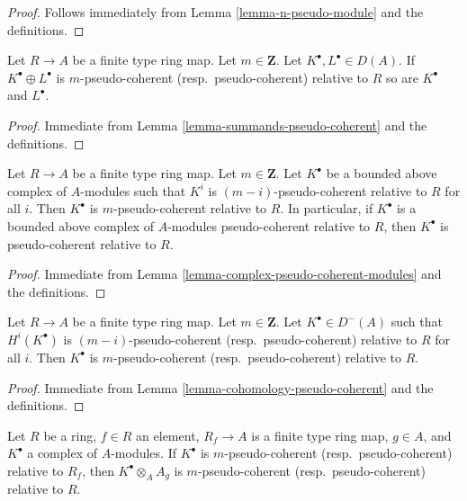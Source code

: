 \begin{proof}
Follows immediately from
Lemma \ref{lemma-n-pseudo-module}
and the definitions.
\end{proof}

\begin{lemma}
\label{lemma-summands-relative-pseudo-coherent}
Let $R \to A$ be a finite type ring map.
Let $m \in \mathbf{Z}$. Let $K^\bullet, L^\bullet \in D(A)$.
If $K^\bullet \oplus L^\bullet$
is $m$-pseudo-coherent (resp.\ pseudo-coherent) relative to $R$
so are $K^\bullet$ and $L^\bullet$.
\end{lemma}

\begin{proof}
Immediate from
Lemma \ref{lemma-summands-pseudo-coherent}
and the definitions.
\end{proof}

\begin{lemma}
\label{lemma-complex-relative-pseudo-coherent-modules}
Let $R \to A$ be a finite type ring map.
Let $m \in \mathbf{Z}$. Let $K^\bullet$ be a bounded
above complex of $A$-modules such that $K^i$ is $(m - i)$-pseudo-coherent
relative to $R$ for all $i$. Then $K^\bullet$ is $m$-pseudo-coherent
relative to $R$. In particular, if $K^\bullet$ is a bounded above complex of
$A$-modules pseudo-coherent relative to $R$, then $K^\bullet$ is
pseudo-coherent relative to $R$.
\end{lemma}

\begin{proof}
Immediate from
Lemma \ref{lemma-complex-pseudo-coherent-modules}
and the definitions.
\end{proof}

\begin{lemma}
\label{lemma-cohomology-relative-pseudo-coherent}
Let $R \to A$ be a finite type ring map. Let $m \in \mathbf{Z}$.
Let $K^\bullet \in D^{-}(A)$ such that $H^i(K^\bullet)$ is
$(m - i)$-pseudo-coherent (resp.\ pseudo-coherent) relative to $R$
for all $i$. Then $K^\bullet$ is $m$-pseudo-coherent
(resp.\ pseudo-coherent) relative to $R$.
\end{lemma}

\begin{proof}
Immediate from
Lemma \ref{lemma-cohomology-pseudo-coherent}
and the definitions.
\end{proof}

\begin{lemma}
\label{lemma-localize-relative-pseudo-coherent}
Let $R$ be a ring, $f \in R$ an element, $R_f \to A$ is a finite type ring map,
$g \in A$, and $K^\bullet$ a complex of $A$-modules.
If $K^\bullet$ is $m$-pseudo-coherent (resp.\ pseudo-coherent)
relative to $R_f$, then $K^\bullet \otimes_A A_g$ is
$m$-pseudo-coherent (resp.\ pseudo-coherent) relative to $R$.
\end{lemma}

